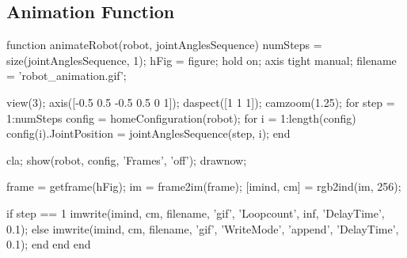 \documentclass[conference]{IEEEtran}
\begin{document}
\subsection{Animation Function}
\begin{matlabcode}[label={AnimateAppendix}]
function animateRobot(robot, jointAnglesSequence)
    numSteps = size(jointAnglesSequence, 1);
    hFig = figure;
    hold on;
    axis tight manual; %
    filename = 'robot_animation.gif'; %

    view(3); %
    axis([-0.5 0.5 -0.5 0.5 0 1]); %
    daspect([1 1 1]); %
    camzoom(1.25); %
    for step = 1:numSteps
        config = homeConfiguration(robot);
        for i = 1:length(config)
            config(i).JointPosition = jointAnglesSequence(step, i);
        end
        
        cla;
        show(robot, config, 'Frames', 'off');
        drawnow;
   
        
      
        
        frame = getframe(hFig);
        im = frame2im(frame);
        [imind, cm] = rgb2ind(im, 256);
        
        if step == 1
            imwrite(imind, cm, filename, 'gif', 'Loopcount', inf, 'DelayTime', 0.1);
        else
            imwrite(imind, cm, filename, 'gif', 'WriteMode', 'append', 'DelayTime', 0.1);
        end
    end
end
\end{matlabcode}
\end{document}
